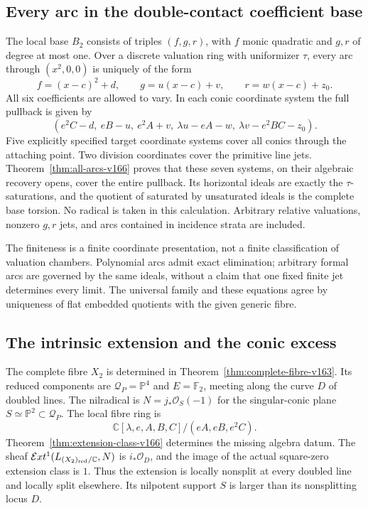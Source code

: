 \documentclass[11pt,reqno]{amsart}
\numberwithin{equation}{section}
\theoremstyle{definition}\newtheorem{definition}[theorem]{Definition}
\theoremstyle{remark}\newtheorem{remark}[theorem]{Remark}
\newcommand{\C}{\mathbb C}\newcommand{\Q}{\mathbb Q}
\newcommand{\Pj}{\mathbb P}\newcommand{\A}{\mathbb A}
\newcommand{\OO}{\mathcal O}\newcommand{\II}{\mathcal I}
\begin{document}
\subsection{Every arc in the double-contact coefficient base}
The local base $B_2$ consists of triples $(f,g,r)$, with $f$ monic
quadratic and $g,r$ of degree at most one. Over a discrete valuation
ring with uniformizer $\tau$, every arc through $(x^2,0,0)$ is
uniquely of the form
\[
 f=(x-c)^2+d,\qquad g=u(x-c)+v,\qquad r=w(x-c)+z_0.
\]
All six coefficients are allowed to vary. In each conic coordinate
system the full pullback is given by
\[
 (e^2C-d,\ eB-u,\ e^2A+v,\ \lambda u-eA-w,
                         \ \lambda v-e^2BC-z_0).
\]
Five explicitly specified target coordinate systems cover all
conics through the attaching point. Two division coordinates cover
the primitive line jets. Theorem~\ref{thm:all-arcs-v166} proves
that these seven systems, on their algebraic recovery opens, cover
the entire pullback. Its horizontal ideals are exactly the
$\tau$-saturations, and the quotient of saturated by unsaturated
ideals is the complete base torsion. No radical is taken in this
calculation. Arbitrary relative valuations, nonzero $g,r$ jets,
and arcs contained in incidence strata are included.

The finiteness is a finite coordinate presentation, not a finite
classification of valuation chambers. Polynomial arcs admit exact
elimination; arbitrary formal arcs are governed by the same ideals,
without a claim that one fixed finite jet determines every limit.
The universal family and these equations agree by uniqueness of
flat embedded quotients with the given generic fibre.

\subsection{The intrinsic extension and the conic excess}
The complete fibre $X_2$ is determined in
Theorem~\ref{thm:complete-fibre-v163}. Its reduced components are
$\mathcal Q_P=\Pj^4$ and $E=\mathbb F_2$, meeting along the
curve $D$ of doubled lines. The nilradical is
$N=j_*\OO_S(-1)$ for the singular-conic plane
$S\simeq\Pj^2\subset\mathcal Q_P$. The local fibre ring is
\[
 \C[\lambda,e,A,B,C]/(eA,eB,e^2C).
\]
Theorem~\ref{thm:extension-class-v166} determines the missing
algebra datum. The sheaf
$\mathcal E xt^1(L_{(X_2)_{\rm red}/\C},N)$ is $i_*\OO_D$,
and the image of the actual square-zero extension class is $1$.
Thus the extension is locally nonsplit at every doubled line and
locally split elsewhere. Its nilpotent support $S$ is larger than
its nonsplitting locus $D$.
\end{document}
